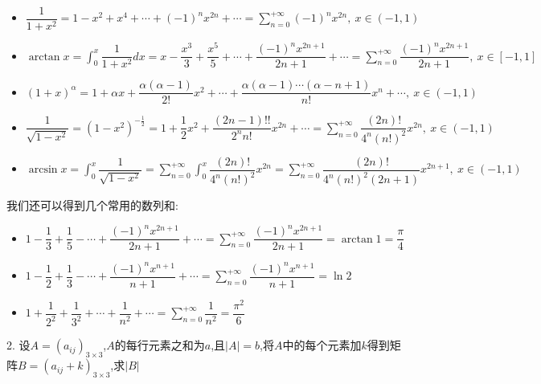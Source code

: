 \begin{anymark}[泰勒级数]
\begin{itemize}
		\item $\dfrac{1}{1+x^2}=1-x^2+x^4+\cdots+(-1)^nx^{2n}+\cdots=\sum\limits_{n=0}^{+\infty}(-1)^nx^{2n},\ x\in(-1,1)$
		\item $\arctan x=\int_{0}^{x}\dfrac{1}{1+x^2}dx=x-\dfrac{x^3}{3}+\dfrac{x^5}{5}+\cdots+\dfrac{(-1)^{n}x^{2n+1}}{2n+1}+\cdots=\sum\limits_{n=0}^{+\infty}\dfrac{(-1)^{n}x^{2n+1}}{2n+1},\ x\in[-1,1]$
		\item $(1+x)^{\alpha}=1+\alpha x+\dfrac{\alpha(\alpha-1)}{2!}x^2+\cdots+\dfrac{\alpha(\alpha-1)\cdots(\alpha-n+1)}{n!}x^n+\cdots,\ x\in(-1,1)$
		\item $\dfrac{1}{\sqrt{1-x^2}}=(1-x^2)^{-\frac{1}{2}}=1+\dfrac{1}{2}x^2+\dfrac{(2n-1)!!}{2^nn!}x^{2n}+\cdots=\sum\limits_{n=0}^{+\infty}\dfrac{(2n)!}{4^n(n!)^2}x^{2n},\ x\in(-1,1)$
		\item $\arcsin x=\int_{0}^{x}\dfrac{1}{\sqrt{1-x^2}}=\sum\limits_{n=0}^{+\infty}\int_{0}^{x}\dfrac{(2n)!}{4^n(n!)^2}x^{2n}=\sum\limits_{n=0}^{+\infty}\dfrac{(2n)!}{4^n(n!)^2(2n+1)}x^{2n+1},\ x\in(-1,1)$
	\end{itemize}
	我们还可以得到几个常用的数列和: 
	\begin{itemize}
		\item $1-\dfrac{1}{3}+\dfrac{1}{5}-\cdots+\dfrac{(-1)^nx^{2n+1}}{2n+1}+\cdots=\sum\limits_{n=0}^{+\infty}\dfrac{(-1)^nx^{2n+1}}{2n+1}=\arctan 1=\dfrac{\pi}{4}$
		\item $1-\dfrac{1}{2}+\dfrac{1}{3}-\cdots+\dfrac{(-1)^nx^{n+1}}{n+1}+\cdots=\sum\limits_{n=0}^{+\infty}\dfrac{(-1)^nx^{n+1}}{n+1}=\ln 2$
		\item $1+\dfrac{1}{2^2}+\dfrac{1}{3^2}+\cdots+\dfrac{1}{n^2}+\cdots=\sum\limits_{n=0}^{+\infty}\dfrac{1}{n^2}=\dfrac{\pi^2}{6}$
	\end{itemize}
\end{anymark}
2. 设$A=(a_{ij})_{3\times 3}$,$A$的每行元素之和为$a$,且$|A|=b$,将$A$中的每个元素加$k$得到矩阵$B=(a_{ij}+k)_{3\times 3}$,求$|B|$
